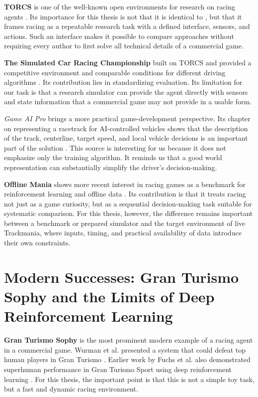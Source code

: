\textbf{TORCS} is one of the well-known open environments for research on racing agents \cite{wymann2000torcs}. Its importance for this thesis is not that it is identical to \Trackmania{}, but that it frames racing as a repeatable research task with a defined interface, sensors, and actions. Such an interface makes it possible to compare approaches without requiring every author to first solve all technical details of a commercial game.

\textbf{The Simulated Car Racing Championship} built on TORCS and provided a competitive environment and comparable conditions for different driving algorithms \cite{loiacono2010scrc}. Its contribution lies in standardizing evaluation. Its limitation for our task is that a research simulator can provide the agent directly with sensors and state information that a commercial game may not provide in a usable form.

\emph{Game AI Pro} brings a more practical game-development perspective. Its chapter on representing a racetrack for AI-controlled vehicles shows that the description of the track, centerline, target speed, and local vehicle decisions is an important part of the solution \cite{game_ai_pro_racetrack2013}. This source is interesting for us because it does not emphasize only the training algorithm. It reminds us that a good world representation can substantially simplify the driver's decision-making.

\textbf{Offline Mania} shows more recent interest in racing games as a benchmark for reinforcement learning and offline data \cite{offline_mania2024}. Its contribution is that it treats racing not just as a game curiosity, but as a sequential decision-making task suitable for systematic comparison. For this thesis, however, the difference remains important between a benchmark or prepared simulator and the target environment of live Trackmania, where inputs, timing, and practical availability of data introduce their own constraints.

\section[Gran Turismo Sophy]{Modern Successes: Gran Turismo Sophy and the Limits of Deep Reinforcement Learning}

\textbf{Gran Turismo Sophy} is the most prominent modern example of a racing agent in a commercial game. Wurman et al. presented a system that could defeat top human players in Gran Turismo \cite{wurman2022gt_sophy}. Earlier work by Fuchs et al. also demonstrated superhuman performance in Gran Turismo Sport using deep reinforcement learning \cite{gt_sport_drl_fuchs2021}. For this thesis, the important point is that this is not a simple toy task, but a fast and dynamic racing environment.

